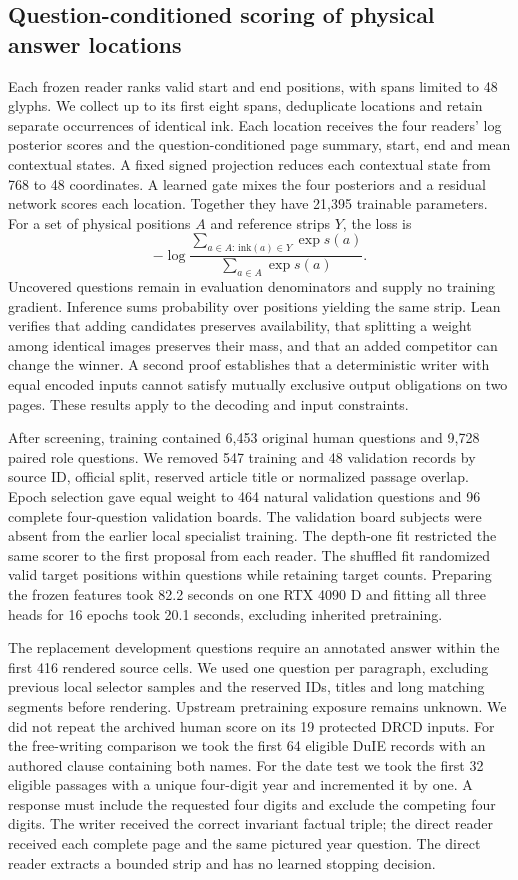 \documentclass[12pt,a4paper]{article}
\providecommand{\DIFadd}[1]{{\protect\color{blue} \sf #1}} %
\begin{document}
\subsection*{\DIFadd{Question-conditioned scoring of physical answer locations}}
\DIFadd{Each frozen reader ranks valid start and end positions, with spans limited to 48 glyphs. We collect up to its first eight spans, deduplicate locations and retain separate occurrences of identical ink. Each location receives the four readers' log posterior scores and the question-conditioned page summary, start, end and mean contextual states. A fixed signed projection reduces each contextual state from 768 to 48 coordinates. A learned gate mixes the four posteriors and a residual network scores each location. Together they have 21,395 trainable parameters. For a set of physical positions $A$ and reference strips $Y$, the loss is
}\[
-\log \frac{\sum_{a\in A:\,\mathrm{ink}(a)\in Y}\exp s(a)}{\sum_{a\in A}\exp s(a)} .
\]
\DIFadd{Uncovered questions remain in evaluation denominators and supply no training gradient. Inference sums probability over positions yielding the same strip. Lean verifies that adding candidates preserves availability, that splitting a weight among identical images preserves their mass, and that an added competitor can change the winner. A second proof establishes that a deterministic writer with equal encoded inputs cannot satisfy mutually exclusive output obligations on two pages. These results apply to the decoding and input constraints.
}

\DIFadd{After screening, training contained 6,453 original human questions and 9,728 paired role questions. We removed 547 training and 48 validation records by source ID, official split, reserved article title or normalized passage overlap. Epoch selection gave equal weight to 464 natural validation questions and 96 complete four-question validation boards. The validation board subjects were absent from the earlier local specialist training. The depth-one fit restricted the same scorer to the first proposal from each reader. The shuffled fit randomized valid target positions within questions while retaining target counts. Preparing the frozen features took 82.2 seconds on one RTX 4090 D and fitting all three heads for 16 epochs took 20.1 seconds, excluding inherited pretraining.
}

\DIFadd{The replacement development questions require an annotated answer within the first 416 rendered source cells. We used one question per paragraph, excluding previous local selector samples and the reserved IDs, titles and long matching segments before rendering. Upstream pretraining exposure remains unknown. We did not repeat the archived human score on its 19 protected DRCD inputs. For the free-writing comparison we took the first 64 eligible DuIE records with an authored clause containing both names. For the date test we took the first 32 eligible passages with a unique four-digit year and incremented it by one. A response must include the requested four digits and exclude the competing four digits. The writer received the correct invariant factual triple; the direct reader received each complete page and the same pictured year question. The direct reader extracts a bounded strip and has no learned stopping decision.
}
\end{document}
